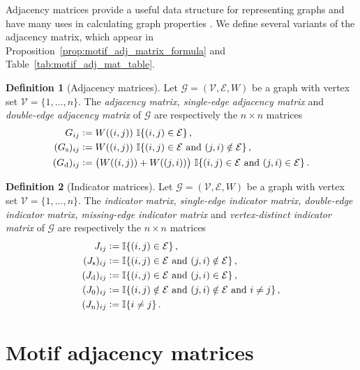 \documentclass[12pt,draft]{ociamthesis}
\theoremstyle{plain}
\theoremstyle{definition}
\newtheorem{definition}{Definition}[chapter]
\theoremstyle{remark}
\newcommand\bb[1]{\mathbb{#1}}
\newcommand\ca[1]{\mathcal{#1}}
\begin{document}
Adjacency matrices provide a useful data structure for representing graphs and
have many uses in calculating graph properties \cite{bapat2010graphs}.  We
define several variants of the adjacency matrix, which appear in
Proposition~\ref{prop:motif_adj_matrix_formula} and
Table~\ref{tab:motif_adj_mat_table}.

\begin{definition}[Adjacency matrices]
Let $\ca{G} = (\ca{V,E},W)$ be a graph with vertex set $\ca{V} = \{1, \ldots,
n \}$. The \emph{adjacency matrix, single-edge adjacency matrix} and
\emph{double-edge adjacency matrix} of $\ca{G}$ are respectively the $n
\times n$ matrices
\begin{align*}
G_{i j} &\vcentcolon= W((i,j)) \ \bb{I} \{ (i,j) \in \ca{E} \}\,, \\
(G_\mathrm{s})_{i j} &\vcentcolon= W((i,j)) \ \bb{I} \{ (i,j) \in \ca{E}
\textrm{ and } (j,i) \notin \ca{E} \}\,, \\
(G_\mathrm{d})_{i j} &\vcentcolon= \big( W((i,j)) + W((j,i)) \big) \ \bb{I}
\{ (i,j) \in \ca{E} \textrm{ and } (j,i) \in \ca{E} \}\,.
\end{align*}
\end{definition}

\begin{definition}[Indicator matrices]
Let $\ca{G} = (\ca{V,E},W)$ be a graph with vertex set $\ca{V} = \{1, \ldots,
n \}$. The \emph{indicator matrix, single-edge indicator matrix, double-edge
indicator matrix, missing-edge indicator matrix} and \emph{vertex-distinct
indicator matrix} of $\ca{G}$ are respectively the $n \times n$ matrices
\begin{align*}
J_{i j} &\vcentcolon= \bb{I} \{ (i,j) \in \ca{E} \}\,, \\
(J_\mathrm{s})_{i j} &\vcentcolon= \bb{I} \{ (i,j) \in \ca{E} \textrm{ and }
(j,i) \notin \ca{E} \}\,, \\
(J_\mathrm{d})_{i j} &\vcentcolon= \bb{I} \{ (i,j) \in \ca{E} \textrm{ and }
(j,i) \in \ca{E} \}\,, \\
(J_0)_{i j} &\vcentcolon= \bb{I} \{ (i,j) \notin \ca{E} \textrm{ and } (j,i)
\notin \ca{E} \textrm{ and } i \neq j \}\,, \\
(J_\mathrm{n})_{i j} &\vcentcolon= \bb{I} \{ i \neq j \}\,.
\end{align*}
\end{definition}

\section{Motif adjacency matrices} \label{sec:graphs_motif_adj_matrices}
\end{document}

